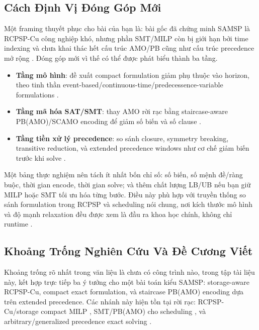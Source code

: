 \subsection*{Cách Định Vị Đóng Góp Mới}


Một framing thuyết phục cho bài của bạn là: bài gốc đã chứng minh SAMSP là RCPSP-Cu công nghiệp khó, nhưng phần SMT/MILP còn bị giới hạn bởi time indexing và chưa khai thác hết cấu trúc AMO/PB cũng như cấu trúc precedence mở rộng  \cite{Bofill2022The}. Đóng góp mới vì thế có thể được phát biểu thành ba tầng.


\begin{itemize}
\item \textbf{Tầng mô hình}: đề xuất compact formulation giảm phụ thuộc vào horizon, theo tinh thần event-based/continuous-time/predecessence-variable formulations  \cite{Koné2009Event-based} \cite{Klein2024Mixed-integer} \cite{Ahn2025A}.
\item \textbf{Tầng mã hóa SAT/SMT}: thay AMO rời rạc bằng staircase-aware PB(AMO)/SCAMO encoding để giảm số biến và số clause  \cite{Bofill2021SAT} \cite{Truong2025Sequential} \cite{Bofill2023SAT}.
\item \textbf{Tầng tiền xử lý precedence}: so sánh closure, symmetry breaking, transitive reduction, và extended precedence windows như cơ chế giảm biến trước khi solve  \cite{Bofill2022The} \cite{Edwards2019Symmetry} \cite{Meng2023Transitive}.
\end{itemize}


Một bảng thực nghiệm nên tách ít nhất bốn chỉ số: số biến, số mệnh đề/ràng buộc, thời gian encode, thời gian solve; và thêm chất lượng LB/UB nếu bạn giữ MILP hoặc SMT tối ưu hóa từng bước. Điều này phù hợp với truyền thống so sánh formulation trong RCPSP và scheduling nói chung, nơi kích thước mô hình và độ mạnh relaxation đều được xem là đầu ra khoa học chính, không chỉ runtime  \cite{Koné2009Event-based} \cite{Tesch2017Improved} \cite{Al-Khatib2025A}.


\subsection*{Khoảng Trống Nghiên Cứu Và Đề Cương Viết}


Khoảng trống rõ nhất trong văn liệu là chưa có công trình nào, trong tập tài liệu này, kết hợp trực tiếp ba ý tưởng cho một bài toán kiểu SAMSP: storage-aware RCPSP-Cu, compact exact formulation, và staircase PB(AMO) encoding dựa trên extended precedence. Các nhánh này hiện tồn tại rời rạc: RCPSP-Cu/storage compact MILP  \cite{Klein2024Mixed-integer}, SMT/PB(AMO) cho scheduling  \cite{Bofill2020SMT} \cite{Bofill2021SAT}, và arbitrary/generalized precedence exact solving  \cite{DeAzevedo2021A} \cite{Schnell2015On}.


